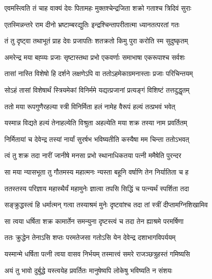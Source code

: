 \twolineshloka
{एवमस्त्विति तं चाह वाक्यं देवः पितामहः}
{मुक्तश्चेन्द्रजिता शक्रो गताश्च त्रिदिवं सुराः} %

\twolineshloka
{एतस्मिन्नन्तरे राम दीनो भ्रष्टाम्बरद्युतिः}
{इन्द्रश्चिन्तापरीतात्मा ध्यानतत्परतां गतः} %

\twolineshloka
{तं तु दृष्ट्वा तथाभूतं प्राह देवः प्रजापतिः}
{शतक्रतो किमु पुरा करोति स्म सुदुष्कृतम्} %

\twolineshloka
{अमरेन्द्र मया बह्व्यः प्रजाः सृष्टास्तथा प्रभो}
{एकवर्णाः समाभाषा एकरूपाश्च सर्वशः} %

\twolineshloka
{तासां नास्ति विशेषो हि दर्शने लक्षणेऽपि वा}
{ततोऽहमेकाग्रमनास्ताः प्रजाः परिचिन्तयम्} %

\twolineshloka
{सोऽहं तासां विशेषार्थं स्त्रियमेकां विनिर्ममे}
{यद्यत्प्रजानां प्रत्यङ्गं विशिष्टं तत्तदुद्धृतम्} %

\twolineshloka
{ततो मया रूपगुणैरहल्या स्त्री विनिर्मिता}
{हलं नामेह वैरूपं हल्यं तत्प्रभवं भवेत्} %

\twolineshloka
{यस्मान्न विद्यते हल्यं तेनाहल्येति विश्रुता}
{अहल्येति मया शक्र तस्या नाम प्रवर्तितम्} %

\twolineshloka
{निर्मितायां च देवेन्द्र तस्यां नार्यां सुरर्षभ}
{भविष्यतीति कस्यैषा मम चिन्ता ततोऽभवत्} %

\twolineshloka
{त्वं तु शक्र तदा नारीं जानीषे मनसा प्रभो}
{स्थानाधिकतया पत्नी ममैषेति पुरन्दर} %

\twolineshloka
{सा मया न्यासभूता तु गौतमस्य महात्मनः}
{न्यस्ता बहूनि वर्षाणि तेन निर्यातिता च ह} %

\twolineshloka
{ततस्तस्य परिज्ञाय महास्थैर्यं महामुनेः}
{ज्ञात्वा तपसि सिद्धिं च पत्न्यर्थं स्पर्शिता तदा} %

\twolineshloka
{सङ्क्रुद्धस्त्वं हि धर्मात्मन् गत्वा तस्याश्रमं मुनेः}
{दृष्टवांश्च तदा तां स्त्रीं दीप्तामग्निशिखामिव} %

\twolineshloka
{सा त्वया धर्षिता शक्र कामार्तेन समन्युना}
{दृष्टस्त्वं च तदा तेन ह्याश्रमे परमर्षिणा} %

\twolineshloka
{ततः क्रुद्धेन तेनाऽसि शप्तः परमतेजसा}
{गतोऽसि येन देवेन्द्र दशाभागविपर्ययम्} %

\twolineshloka
{यस्मान्मे धर्षिता पत्नी त्वया वासव निर्भयम्}
{तस्मात्त्वं समरे राजञ्छत्रुहस्तं गमिष्यसि} %

\twolineshloka
{अयं तु भावो दुर्बुद्धे यस्त्वयेह प्रवर्तितः}
{मानुषेष्वपि लोकेषु भविष्यति न संशयः} %

